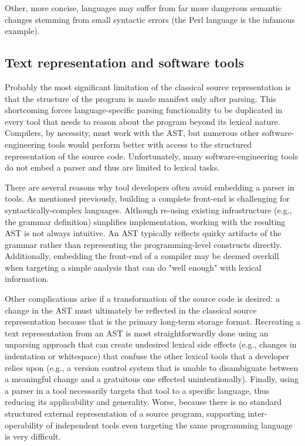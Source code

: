 \documentclass{article}
\begin{document}
Other, more concise, languages may suffer from far more dangerous semantic
changes stemming from small syntactic errors (the Perl language is the infamous
example).

\subsection{Text representation and software tools}

Probably the most significant limitation of the classical source representation
is that the structure
of the program is made manifest only after parsing.  This shortcoming
forces language-specific parsing functionality to be duplicated in every
tool that needs to reason about the program beyond its lexical nature.
Compilers, by necessity, must work with the AST, but numerous other
software-engineering tools would perform better with access to the
structured representation of the source code.  Unfortunately, many
software-engineering tools do not embed a parser and thus are limited to
lexical tasks.

There are several reasons why tool developers often avoid embedding a parser in
tools.  As mentioned previously, building a complete front-end is
challenging for syntactically-complex languages.  Although re-using
existing infrastructure (e.g., the grammar definition) simplifies
implementation, working with the resulting AST is not always intuitive.  An
AST typically reflects quirky artifacts of the grammar rather than
representing the programming-level constructs directly.  Additionally,
embedding the front-end of a compiler may be deemed overkill when targeting
a simple analysis that can do "well enough" with lexical information.

Other complications arise if a transformation of the source code is
desired: a change in the AST must ultimately be reflected in the classical
source representation
because that is the primary long-term storage format.  Recreating a text
representation from an AST is most
straightforwardly done using an unparsing approach that can create
undesired lexical side effects (e.g., changes in indentation or
whitespace) that confuse the other lexical tools that a developer
relies upon (e.g., a version control system that is unable to
disambiguate between a meaningful change and a gratuitous one effected
unintentionally).  Finally, using a parser in a tool necessarily targets
that tool to a specific language, thus reducing its applicability and
generality.  Worse, because there is no standard structured external
representation of a source program, supporting inter-operability of
independent tools even targeting the same programming language is
very difficult.
\end{document}
